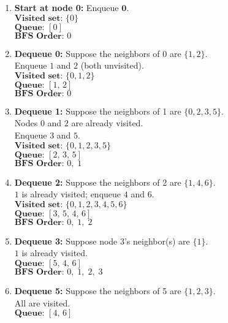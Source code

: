 \documentclass[11pt]{article}
\begin{document}
\begin{enumerate}[label=\arabic*.]
    \item \textbf{Start at node 0:} Enqueue \(\mathbf{0}\). \\
          \(\textbf{Visited set: } \{0\}\) \\
          \(\textbf{Queue: } [0]\) \\
          \(\textbf{BFS Order: } 0\)
    \item \textbf{Dequeue 0:} Suppose the neighbors of 0 are \(\{1,2\}\). \\
          Enqueue \(1\) and \(2\) (both unvisited). \\
          \(\textbf{Visited set: } \{0,1,2\}\) \\
          \(\textbf{Queue: } [1,\,2]\) \\
          \(\textbf{BFS Order: } 0\)
    \item \textbf{Dequeue 1:} Suppose the neighbors of 1 are \(\{0,2,3,5\}\). \\
          Nodes \(0\) and \(2\) are already visited. \\
          Enqueue \(3\) and \(5\). \\
          \(\textbf{Visited set: } \{0,1,2,3,5\}\) \\
          \(\textbf{Queue: } [2,\,3,\,5]\) \\
          \(\textbf{BFS Order: } 0,\; 1\)
    \item \textbf{Dequeue 2:} Suppose the neighbors of 2 are \(\{1,4,6\}\). \\
          \(1\) is already visited; enqueue \(4\) and \(6\). \\
          \(\textbf{Visited set: } \{0,1,2,3,4,5,6\}\) \\
          \(\textbf{Queue: } [3,\,5,\,4,\,6]\) \\
          \(\textbf{BFS Order: } 0,\; 1,\; 2\)
    \item \textbf{Dequeue 3:} Suppose node 3's neighbor(s) are \(\{1\}\). \\
          \(1\) is already visited. \\
          \(\textbf{Queue: } [5,\,4,\,6]\) \\
          \(\textbf{BFS Order: } 0,\; 1,\; 2,\; 3\)
    \item \textbf{Dequeue 5:} Suppose the neighbors of 5 are \(\{1,2,3\}\). \\
          All are visited. \\
          \(\textbf{Queue: } [4,\,6]\) \\

\end{enumerate}
\end{document}
